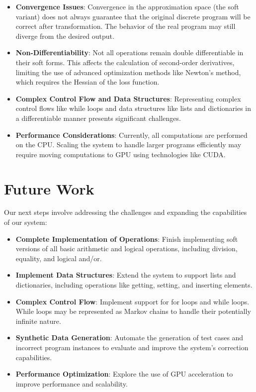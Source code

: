 \documentclass{article}
\begin{document}
\begin{itemize}
    \item \textbf{Convergence Issues}: Convergence in the approximation space (the soft variant) does not always guarantee that the original discrete program will be correct after transformation. The behavior of the real program may still diverge from the desired output.

    \item \textbf{Non-Differentiability}: Not all operations remain double differentiable in their soft forms. This affects the calculation of second-order derivatives, limiting the use of advanced optimization methods like Newton's method, which requires the Hessian of the loss function.

    \item \textbf{Complex Control Flow and Data Structures}: Representing complex control flows like while loops and data structures like lists and dictionaries in a differentiable manner presents significant challenges.

    \item \textbf{Performance Considerations}: Currently, all computations are performed on the CPU. Scaling the system to handle larger programs efficiently may require moving computations to GPU using technologies like CUDA.
\end{itemize}

\section{Future Work}

Our next steps involve addressing the challenges and expanding the capabilities of our system:

\begin{itemize}
    \item \textbf{Complete Implementation of Operations}: Finish implementing soft versions of all basic arithmetic and logical operations, including division, equality, and logical and/or.

    \item \textbf{Implement Data Structures}: Extend the system to support lists and dictionaries, including operations like getting, setting, and inserting elements.

    \item \textbf{Complex Control Flow}: Implement support for for loops and while loops. While loops may be represented as Markov chains to handle their potentially infinite nature.

    \item \textbf{Synthetic Data Generation}: Automate the generation of test cases and incorrect program instances to evaluate and improve the system's correction capabilities.

    \item \textbf{Performance Optimization}: Explore the use of GPU acceleration to improve performance and scalability.
\end{itemize}
\end{document}
